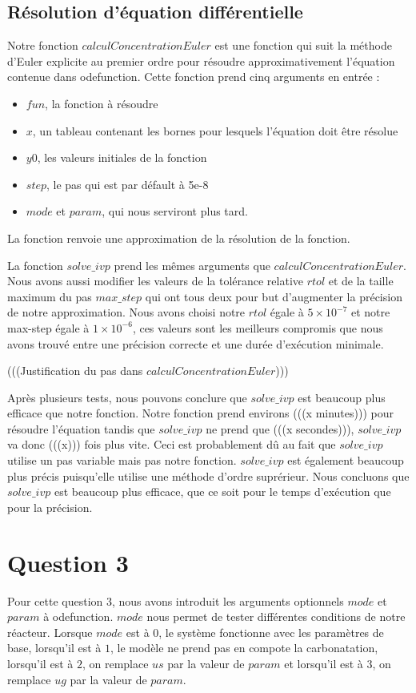 \documentclass[11pt]{report}
\newcommand{\mychapter}[2]{
    \setcounter{chapter}{#1}
    \setcounter{section}{0}
    \chapter*{#2}
    \addcontentsline{toc}{chapter}{#2}
}
\begin{document}
        \section{Résolution d'équation différentielle}
            Notre fonction $calculConcentrationEuler$ est une fonction qui suit la méthode d'Euler explicite au premier ordre
            pour résoudre approximativement l'équation contenue dans odefunction.
            Cette fonction prend cinq arguments en entrée :
            \begin{itemize}
                \item $fun$, la fonction à résoudre
                \item $x$, un tableau contenant les bornes pour lesquels l'équation doit être résolue
                \item $y0$, les valeurs initiales de la fonction
                \item $step$, le pas qui est par défault à 5e-8
                \item $mode$ et $param$, qui nous serviront plus tard.
            \end{itemize}
            La fonction renvoie une approximation de la résolution de la fonction.
            \par
            La fonction $solve\_ivp$ prend les mêmes arguments que $calculConcentrationEuler$. 
            Nous avons aussi modifier les valeurs de la tolérance relative $rtol$ et de la taille maximum du pas $max\_step$
            qui ont tous deux pour but d'augmenter la précision de notre approximation.
            Nous avons choisi notre $rtol$ égale à $5\times10^{-7}$ et notre max-step égale à $1\times10^{-6}$,
            ces valeurs sont les meilleurs compromis que nous avons trouvé entre une précision correcte
            et une durée d'exécution minimale.
            \par
            (((Justification du pas dans $calculConcentrationEuler$)))
            \par
            Après plusieurs tests, nous pouvons conclure que $solve\_ivp$ est beaucoup plus efficace que notre fonction.
            Notre fonction prend environs (((x minutes))) pour résoudre l'équation tandis que $solve\_ivp$ ne prend que (((x secondes))),
            $solve\_ivp$ va donc (((x))) fois plus vite.
            Ceci est probablement dû au fait que $solve\_ivp$ utilise un pas variable mais pas notre fonction.
            $solve\_ivp$ est également beaucoup plus précis puisqu'elle utilise une méthode d'ordre suprérieur.
            Nous concluons que $solve\_ivp$ est beaucoup plus efficace, que ce soit pour le temps d'exécution que pour la précision.
    \mychapter{3}{Question 3}
        Pour cette question 3, nous avons introduit les arguments optionnels $mode$ et $param$ à odefunction.
        $mode$ nous permet de tester différentes conditions de notre réacteur.
        Lorsque $mode$ est à $0$, le système fonctionne avec les paramètres de base,
        lorsqu'il est à $1$, le modèle ne prend pas en compote la carbonatation,
        lorsqu'il est à $2$, on remplace $us$ par la valeur de $param$
        et lorsqu'il est à $3$, on remplace $ug$ par la valeur de $param$.
\end{document}
